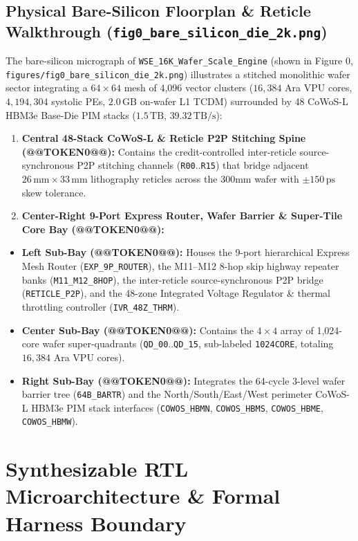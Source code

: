 \documentclass[journal,10pt,twocolumn]{IEEEtran}
\begin{document}
\subsection{Physical Bare-Silicon Floorplan \& Reticle Walkthrough (\texttt{fig0\_bare\_silicon\_die\_2k.png})}

The bare-silicon micrograph of \texttt{WSE\_16K\_Wafer\_Scale\_Engine} (shown in Figure 0, \texttt{figures/fig0\_bare\_silicon\_die\_2k.png}) illustrates a stitched monolithic wafer sector integrating a $64 \times 64$ mesh of 4,096 vector clusters ($16,384$ Ara VPU cores, $4,194,304$ systolic PEs, $2.0\,\mathrm{GB}$ on-wafer L1 TCDM) surrounded by 48 CoWoS-L HBM3e Base-Die PIM stacks ($1.5\,\mathrm{TB}$, $39.32\,\mathrm{TB/s}$):

\begin{enumerate}
  \item \textbf{Central 48-Stack CoWoS-L \& Reticle P2P Stitching Spine (@@TOKEN0@@):} Contains the credit-controlled inter-reticle source-synchronous P2P stitching channels (\texttt{R00}..\texttt{R15}) that bridge adjacent $26\,\mathrm{mm} \times 33\,\mathrm{mm}$ lithography reticles across the 300mm wafer with $\pm 150\,\mathrm{ps}$ skew tolerance.
  \item \textbf{Center-Right 9-Port Express Router, Wafer Barrier \& Super-Tile Core Bay (@@TOKEN0@@):}
\end{enumerate}
\begin{itemize}
  \item \textbf{Left Sub-Bay (@@TOKEN0@@):} Houses the 9-port hierarchical Express Mesh Router (\texttt{EXP\_9P\_ROUTER}), the M11–M12 8-hop skip highway repeater banks (\texttt{M11\_M12\_8HOP}), the inter-reticle source-synchronous P2P bridge (\texttt{RETICLE\_P2P}), and the 48-zone Integrated Voltage Regulator \& thermal throttling controller (\texttt{IVR\_48Z\_THRM}).
  \item \textbf{Center Sub-Bay (@@TOKEN0@@):} Contains the $4 \times 4$ array of 1,024-core wafer super-quadrants (\texttt{QD\_00}..\texttt{QD\_15}, sub-labeled \texttt{1024CORE}, totaling $16,384$ Ara VPU cores).
  \item \textbf{Right Sub-Bay (@@TOKEN0@@):} Integrates the 64-cycle 3-level wafer barrier tree (\texttt{64B\_BARTR}) and the North/South/East/West perimeter CoWoS-L HBM3e PIM stack interfaces (\texttt{COWOS\_HBMN}, \texttt{COWOS\_HBMS}, \texttt{COWOS\_HBME}, \texttt{COWOS\_HBMW}).
\end{itemize}


\section{Synthesizable RTL Microarchitecture \& Formal Harness Boundary}
\end{document}
